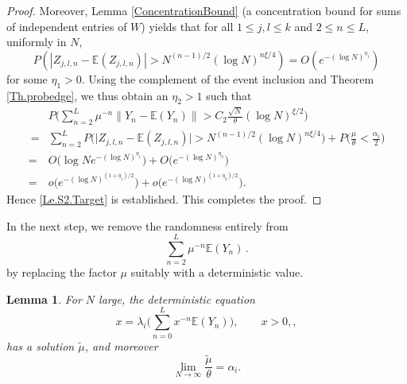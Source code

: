 \documentclass[11pt, reqno]{amsart}
\numberwithin{equation}{section}
\newtheorem{lemma}{Lemma}[section]
\newcommand{\E}{\mbox{${\mathbb E}$}}
\begin{document}
\begin{proof}
Moreover, Lemma \ref{ConcentrationBound} (a concentration bound for sums of independent entries of $W$) yields that for all $1 \le j,l \le k$ and $2 \le n \le L$, uniformly in $N$,
\[ P\left(\left|Z_{j,l,n}-\mathbb E(Z_{j,l,n})\right|>N^{(n-1)/2}(\log N)^{n\xi/4}\right) = O\left(e^{-(\log N)^{\eta_1}}\right)
\]
for some $\eta_1>0$. Using the complement of the event inclusion and Theorem \ref{Th.probedge}, we thus obtain an $\eta_2>1$ such that
\begin{align*}
&P\Big(\sum_{n=2}^L \mu^{-n}\|Y_n-\E(Y_n)\| > C_2\frac{\sqrt{N}}{\theta}(\log N)^{\xi/2}\Big)\\\
=& \sum_{n=2}^L P\Big(\big|Z_{j,l,n}-\E(Z_{j,l,n})\big| > N^{(n-1)/2}(\log N)^{n\xi/4}\Big) + P\Big( \frac{\mu}{\theta} < \frac{\alpha_i}{2}\Big)\\
=& O\Big(\log N  e^{-(\log N)^{\eta_1}}\Big) + O\Big(e^{-(\log N)^{\eta_2}}\Big)\\
=& o\Big(e^{-(\log N)^{(1+\eta_1)/2}}\Big) + o\Big(e^{-(\log N)^{(1+\eta_2)/2}}\Big).
\end{align*}
Hence \eqref{Le.S2.Target} is established. This completes the proof.
\end{proof}

In the next step, we remove the randomness entirely from
\[
\sum_{n=2}^L\mu^{-n}\mathbb E(Y_n)\,.
\]
by replacing the factor $\mu$ suitably with a deterministic value.

\begin{lemma}\label{Le.S3}
For $N$ large, the deterministic equation
\begin{equation}\label{Le.S3.deteqn}
x = \lambda_i\Big(\sum_{n=0}^L x^{-n}\E(Y_n)\Big), \qquad x>0,,
\end{equation}
has a solution $\tilde{\mu}$, and moreover
\begin{equation}\label{Le.S3.detlim}
\lim_{N \to \infty}\frac{\tilde{\mu}}{\theta} = \alpha_i.
\end{equation}
\end{lemma}
\end{document}
